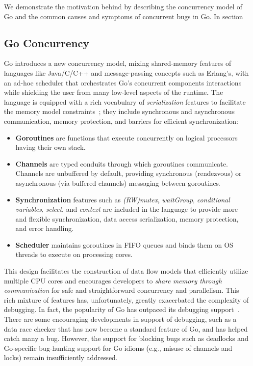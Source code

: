 We demonstrate the motivation behind \goat by describing the concurrency model of Go and the common causes and symptoms of concurrent bugs in Go.
%
In section
%

%

\subsection{Go Concurrency}
\label{sec:goConcurrency}
%
Go introduces a new concurrency model, mixing shared-memory features of languages like Java/C/C++ and message-passing concepts such as Erlang's, with an ad-hoc scheduler that orchestrates Go's concurrent components interactions while shielding the user from many low-level aspects of the runtime.
%
The language is equipped with a rich vocabulary of \textit{serialization} features to facilitate the memory model constraints~\cite{go-memModel}; they include synchronous and asynchronous communication, memory protection, and barriers for efficient synchronization:
\begin{itemize}
    \item \textbf{Goroutines} are functions that execute concurrently on logical processors having their own stack.
    \item \textbf{Channels} are typed conduits through which goroutines communicate.  Channels are unbuffered by default, providing synchronous (rendezvous) or asynchronous (via buffered channels) messaging between goroutines.
    \item \textbf{Synchronization} features such as \textit{(RW)mutex}, \textit{waitGroup}, \textit{conditional variables}, \textit{select}, and \textit{context} are included in the language to provide more and flexible synchronization, data access serialization, memory protection, and error handling.
    \item \textbf{Scheduler} maintains goroutines in FIFO queues and binds them on OS threads to execute on processing cores.
\end{itemize}


This design facilitates the construction of data flow models that efficiently utilize multiple CPU cores and encourages developers to \textit{share memory through communication} for safe and straightforward concurrency and parallelism.
%
This rich mixture of features has, unfortunately, greatly exacerbated the complexity of debugging.
%
In fact, the popularity of Go has outpaced its debugging support~\cite{go-survey,tu-concurrentBugs-asplos19,yuan-gobench-cgo21}.
%
There are some encouraging developments in support of debugging, such as a data race checker \cite{go-race-blog} that has now become a standard feature of Go, and has helped catch many a bug.
%
However, the support for blocking bugs such as deadlocks and Go-specific bug-hunting support for Go idioms (e.g., misuse of channels and locks) remain insufficiently addressed.



